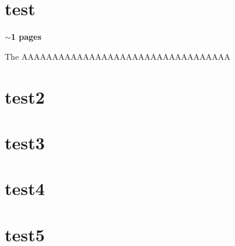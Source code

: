 \section*{test}
\textbf{$\sim$1 pages}

The AAAAAAAAAAAAAAAAAAAAAAAAAAAAAAAAAA

\section*{test2}
\section*{test3}
\section*{test4}
\section*{test5}



\pagebreak
